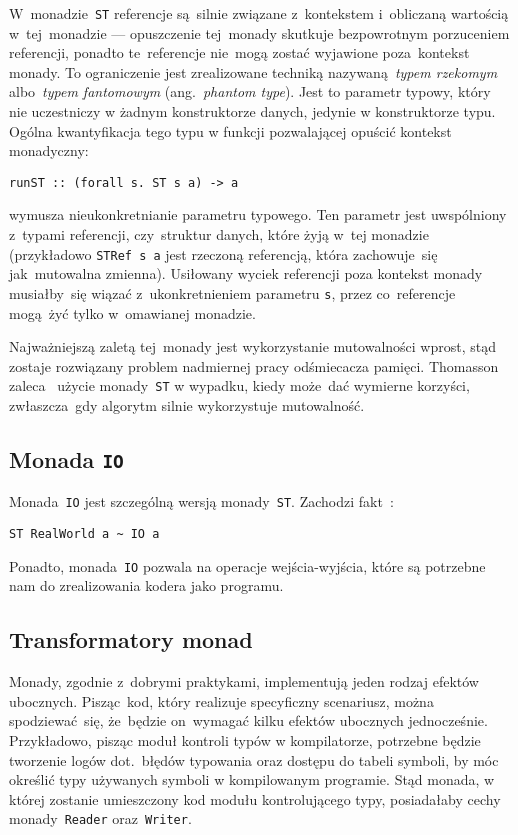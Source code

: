 \documentclass[../../praca.tex]{subfiles}
\begin{document}
W~monadzie~\texttt{ST} referencje są~silnie związane z~kontekstem i~obliczaną wartością
w~tej~monadzie --- opuszczenie tej~monady skutkuje bezpowrotnym porzuceniem referencji,
ponadto te~referencje nie~mogą zostać wyjawione poza~kontekst monady. To ograniczenie
jest zrealizowane techniką nazywaną~\emph{typem rzekomym} albo~\emph{typem fantomowym}
(ang.~\emph{phantom type}). Jest to parametr typowy, który nie uczestniczy w żadnym 
konstruktorze danych, jedynie w konstruktorze typu. Ogólna kwantyfikacja tego typu
w funkcji pozwalającej opuścić kontekst monadyczny:
\begin{verbatim}
runST :: (forall s. ST s a) -> a
\end{verbatim}
wymusza nieukonkretnianie parametru typowego. Ten parametr jest uwspólniony z~typami
referencji, czy~struktur danych, które żyją w~tej monadzie (przykładowo \texttt{STRef s a}
jest rzeczoną referencją, która zachowuje~się jak~mutowalna zmienna).
Usiłowany wyciek referencji poza kontekst monady musiałby~się wiązać z~ukonkretnieniem parametru
\texttt{s}, przez co~referencje mogą~żyć tylko w~omawianej monadzie.

Najważniejszą zaletą tej~monady jest wykorzystanie mutowalności wprost, stąd zostaje rozwiązany
problem nadmiernej pracy odśmiecacza pamięci.
Thomasson zaleca~\cite{Thomasson:HHPP} użycie monady~\texttt{ST} w wypadku, kiedy
może~dać wymierne korzyści, zwłaszcza~gdy algorytm silnie wykorzystuje mutowalność.

\subsection{Monada \texttt{IO}}

Monada~\texttt{IO} jest szczególną wersją monady~\texttt{ST}. Zachodzi fakt~\cite{Snoyman:PH}:
\begin{verbatim}
ST RealWorld a ~ IO a
\end{verbatim}

Ponadto, monada~\texttt{IO} pozwala na operacje wejścia-wyjścia, które są potrzebne nam
do zrealizowania kodera jako programu. 

\subsection{Transformatory monad}

Monady, zgodnie z~dobrymi praktykami, implementują jeden rodzaj efektów ubocznych.
Pisząc~kod, który realizuje specyficzny scenariusz, można spodziewać~się, że~będzie
on~wymagać kilku efektów ubocznych jednocześnie. Przykładowo, pisząc moduł kontroli typów
w kompilatorze, potrzebne będzie tworzenie logów 
dot.~błędów typowania oraz dostępu do tabeli symboli, by móc określić typy
używanych symboli w kompilowanym programie.
Stąd monada, w której zostanie umieszczony kod modułu kontrolującego typy, 
posiadałaby cechy monady~\texttt{Reader} oraz~\texttt{Writer}.
\end{document}
